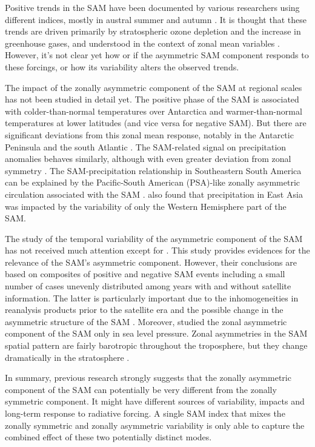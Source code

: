 \documentclass[smallextended]{svjour3}       %
\begin{document}
Positive trends in the SAM have been documented by various researchers using different indices, mostly in austral summer and autumn \citep[e.g.][ and references therein]{fogt2020}.
It is thought that these trends are driven primarily by stratospheric ozone depletion and the increase in greenhouse gases, and understood in the context of zonal mean variables \citep{marshall2004, gillett2005, arblaster2006, gillett2013}.
However, it's not clear yet how or if the asymmetric SAM component responds to these forcings, or how its variability alters the observed trends.

The impact of the zonally asymmetric component of the SAM at regional scales has not been studied in detail yet.
The positive phase of the SAM is associated with colder-than-normal temperatures over Antarctica and warmer-than-normal temperatures at lower latitudes \citep{jones2019} (and vice versa for negative SAM).
But there are significant deviations from this zonal mean response, notably in the Antarctic Peninsula and the south Atlantic \citep{fogt2012}.
The SAM-related signal on precipitation anomalies behaves similarly, although with even greater deviation from zonal symmetry \citep{lim2016}.
The SAM-precipitation relationship in Southeastern South America can be explained by the Pacific-South American (PSA)-like zonally asymmetric circulation associated with the SAM \citep{silvestri2009, rosso2018}.
\citet{fan2007} also found that precipitation in East Asia was impacted by the variability of only the Western Hemisphere part of the SAM.

The study of the temporal variability of the asymmetric component of the SAM has not received much attention except for \citet{fogt2012}.
This study provides evidences for the relevance of the SAM's asymmetric component.
However, their conclusions are based on composites of positive and negative SAM events including a small number of cases unevenly distributed among years with and without satellite information.
The latter is particularly important due to the inhomogeneities in reanalysis products prior to the satellite era and the possible change in the asymmetric structure of the SAM \citep{silvestri2009}.
Moreover, \citet{fogt2012} studied the zonal asymmetric component of the SAM only in sea level pressure.
Zonal asymmetries in the SAM spatial pattern are fairly barotropic throughout the troposphere, but they change dramatically in the stratosphere \citep{baldwin2009}.

In summary, previous research strongly suggests that the zonally asymmetric component of the SAM can potentially be very different from the zonally symmetric component.
It might have different sources of variability, impacts and long-term response to radiative forcing.
A single SAM index that mixes the zonally symmetric and zonally asymmetric variability is only able to capture the combined effect of these two potentially distinct modes.
\end{document}
